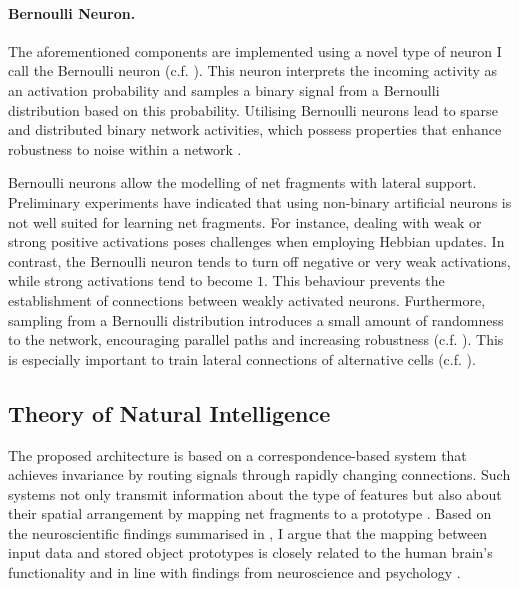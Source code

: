\paragraph{Bernoulli Neuron.} The aforementioned components are implemented using a novel type of neuron I call the Bernoulli neuron (c.f. ). This neuron interprets the incoming activity as an activation probability and samples a binary signal from a Bernoulli distribution based on this probability. Utilising Bernoulli neurons lead to sparse and distributed binary network activities, which possess properties that enhance robustness to noise within a network .

Bernoulli neurons allow the modelling of net fragments with lateral support. Preliminary experiments have indicated that using non-binary artificial neurons is not well suited for learning net fragments. For instance, dealing with weak or strong positive activations poses challenges when employing Hebbian updates. In contrast, the Bernoulli neuron tends to turn off negative or very weak activations, while strong activations tend to become $1$. This behaviour prevents the establishment of connections between weakly activated neurons. Furthermore, sampling from a Bernoulli distribution introduces a small amount of randomness to the network, encouraging parallel paths and increasing robustness (c.f. ). This is especially important to train lateral connections of alternative cells (c.f. ).

\subsection{Theory of Natural Intelligence}
The proposed architecture is based on a correspondence-based system  that achieves invariance by routing signals through rapidly changing connections. Such systems not only transmit information about the type of features but also about their spatial arrangement by mapping net fragments to a prototype .
Based on the neuroscientific findings summarised in , I argue that the mapping between input data and stored object prototypes is closely related to the human brain's functionality and in line with findings from neuroscience  and psychology .

